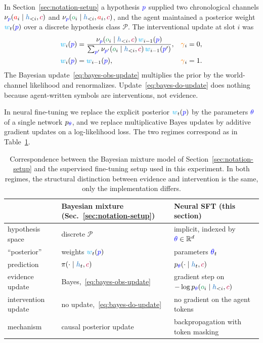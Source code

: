 \documentclass[11pt]{article}
\newcommand{\ProgramSet}{\mathcal{P}}
\newcommand{\action}{\ensuremath{\textcolor{red}{a}}}
\newcommand{\obs}{\ensuremath{\textcolor{ForestGreen}{o}}}
\newcommand{\program}{\ensuremath{\textcolor{blue}{p}}}
\newcommand{\contextsym}{\ensuremath{\textcolor{purple}{c}}}
\newcommand{\gate}{\ensuremath{\textcolor{orange}{\gamma}}}
\newcommand{\weight}{\ensuremath{\textcolor{cyan}{w}}}
\newcommand{\history}{\ensuremath{\textcolor{RoyalBlue}{h}}}
\newcommand{\thetap}{\ensuremath{\textcolor{blue}{\theta}}}
\newcommand{\policy}{\ensuremath{\pi}}
\newcommand{\kernel}{\ensuremath{\nu}}
\begin{document}
In Section~\ref{sec:notation-setup} a hypothesis $\program$ supplied two
chronological channels $\kernel_{\program}(\action_i\mid\history_{<i},\contextsym)$
and $\kernel_{\program}(\obs_i\mid\history_{<i},\action_i,\contextsym)$, and the
agent maintained a posterior weight $\weight_t(\program)$ over a discrete
hypothesis class $\ProgramSet$. The interventional update at slot $i$ was
\begin{align}
\weight_i(\program)
&=
\frac{\kernel_{\program}(\obs_i\mid\history_{<i},\contextsym)\,
      \weight_{i-1}(\program)}
     {\sum_{\program'}\kernel_{\program'}(\obs_i\mid\history_{<i},\contextsym)\,
      \weight_{i-1}(\program')},
&& \gate_i=0,
\label{eq:bayes-obs-update}\\
\weight_i(\program)
&=
\weight_{i-1}(\program),
&& \gate_i=1.
\label{eq:bayes-do-update}
\end{align}
The Bayesian update~\eqref{eq:bayes-obs-update} multiplies the prior by the
world-channel likelihood and renormalizes. Update~\eqref{eq:bayes-do-update} does nothing because agent-written symbols
are interventions, not evidence.

In neural fine-tuning we replace the explicit posterior $\weight_t(\program)$ by
the parameters ${\thetap}$ of a single network $p_{\thetap}$, and we replace
multiplicative Bayes updates by additive gradient updates on a log-likelihood
loss. The two regimes correspond as in Table~\ref{tab:bayes-vs-sft}.

\begin{table}[h]
\centering
\small
\begin{tabular}{lll}
\toprule
& Bayesian mixture (Sec.~\ref{sec:notation-setup}) & Neural SFT (this section) \\
\midrule
hypothesis space & discrete $\ProgramSet$ & implicit, indexed by ${\thetap}\in\mathbb{R}^d$ \\
``posterior'' & weights $\weight_t(\program)$ & parameters ${\thetap}_t$ \\
prediction & $\policy(\cdot\mid\history_t,\contextsym)$ & $p_{\thetap}(\cdot\mid\history_t,\contextsym)$ \\
evidence update & Bayes,~\eqref{eq:bayes-obs-update} & gradient step on $-\log p_{\thetap}(\obs_i\mid \history_{<i},\contextsym)$ \\
intervention update & no update,~\eqref{eq:bayes-do-update} & no gradient on the agent tokens \\
mechanism & causal posterior update & backpropagation with token masking \\
\bottomrule
\end{tabular}
\caption{Correspondence between the Bayesian mixture model of
Section~\ref{sec:notation-setup} and the supervised fine-tuning setup used in
this experiment. In both regimes, the structural distinction between evidence
and intervention is the same, only the implementation differs.}
\label{tab:bayes-vs-sft}
\end{table}
\end{document}
